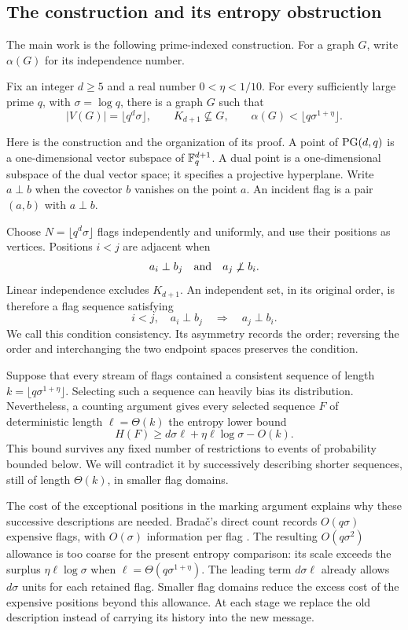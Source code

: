\subsection{The construction and its entropy obstruction}

The main work is the following prime-indexed construction. For a graph
$G$, write $\alpha(G)$ for its independence number.

\begin{theorem}\label{intro:prime-construction}
Fix an integer $d\ge5$ and a real number $0<\eta<1/10$.
For every sufficiently large prime $q$, with $\sigma=\log q$, there is
a graph $G$ such that
\[
 |V(G)|=\lfloor q^d\sigma\rfloor,\qquad
 K_{d+1}\not\subseteq G,\qquad
 \alpha(G)<\lfloor q\sigma^{1+\eta}\rfloor.
\]
\end{theorem}

Here is the construction and the organization of its proof. A point of
$\operatorname{PG}(d,q)$ is a one-dimensional vector subspace of $\mathbb F_q^{d+1}$.
A dual point is a one-dimensional subspace of the dual vector space;
it specifies a projective hyperplane. Write $a\perp b$ when the
covector $b$ vanishes on the point $a$. An incident flag is a pair
$(a,b)$ with $a\perp b$.

Choose $N=\lfloor q^d\sigma\rfloor$ flags independently and uniformly,
and use their positions as vertices. Positions $i<j$ are adjacent when
\[
 a_i\perp b_j\quad\hbox{and}\quad a_j\not\perp b_i.
\]
Linear independence excludes $K_{d+1}$. An independent set, in its
original order, is therefore a flag sequence satisfying
\[
 i<j,\quad a_i\perp b_j\quad\Longrightarrow\quad a_j\perp b_i.
\]
We call this condition consistency. Its asymmetry records the order;
reversing the order and interchanging the two endpoint spaces preserves
the condition.

Suppose that every stream of flags contained a consistent sequence of
length $k=\lfloor q\sigma^{1+\eta}\rfloor$. Selecting such a sequence
can heavily bias its distribution. Nevertheless, a counting argument
gives every selected sequence $F$ of deterministic length
$\ell=\Theta(k)$ the entropy lower bound
\[
 H(F)\ge d\sigma\ell+\eta\ell\log\sigma-O(k).
\]
This bound survives any fixed number of restrictions to events of
probability bounded below. We will contradict it by successively
describing shorter sequences, still of length $\Theta(k)$, in smaller
flag domains.

The cost of the exceptional positions in the marking argument explains
why these successive descriptions are needed. Brada\v{c}'s direct count
records $O(q\sigma)$ expensive flags, with $O(\sigma)$ information
per flag \cite[proof of Lemma~2.12]{Bradac2026}. The resulting
$O(q\sigma^2)$ allowance is too coarse for the present entropy
comparison: its scale exceeds the surplus $\eta\ell\log\sigma$ when
$\ell=\Theta(q\sigma^{1+\eta})$. The leading term $d\sigma\ell$
already allows $d\sigma$ units for each retained flag. Smaller flag
domains reduce the excess cost of the expensive positions beyond this
allowance. At each stage we replace the old description instead of
carrying its history into the new message.

